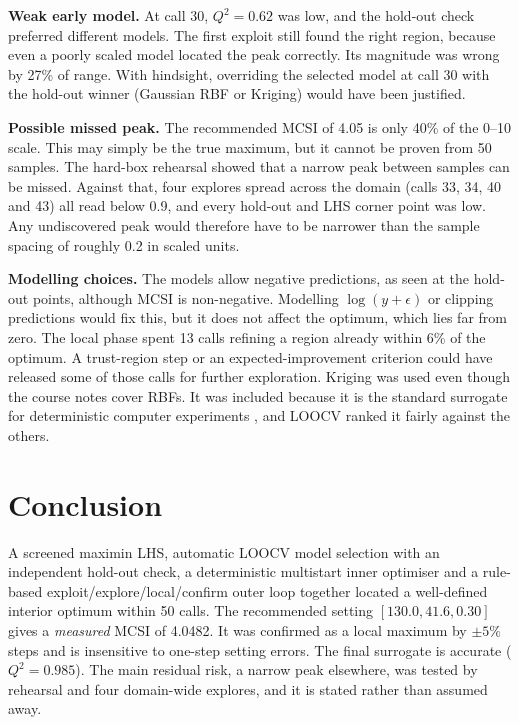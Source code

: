 \documentclass[11pt,a4paper]{article}
\newcommand{\Qsq}{Q^2}
\begin{document}
\textbf{Weak early model.}
At call 30, $\Qsq=0.62$ was low, and the hold-out check preferred different models.
The first exploit still found the right region, because even a poorly scaled model located the peak correctly.
Its magnitude was wrong by 27\% of range.
With hindsight, overriding the selected model at call 30 with the hold-out winner (Gaussian RBF or Kriging) would have been justified.

\textbf{Possible missed peak.}
The recommended MCSI of 4.05 is only 40\% of the 0--10 scale.
This may simply be the true maximum, but it cannot be proven from 50 samples.
The hard-box rehearsal showed that a narrow peak between samples can be missed.
Against that, four explores spread across the domain (calls 33, 34, 40 and 43) all read below 0.9, and every hold-out and LHS corner point was low.
Any undiscovered peak would therefore have to be narrower than the sample spacing of roughly 0.2 in scaled units.

\textbf{Modelling choices.}
The models allow negative predictions, as seen at the hold-out points, although MCSI is non-negative.
Modelling $\log(y+\epsilon)$ or clipping predictions would fix this, but it does not affect the optimum, which lies far from zero.
The local phase spent 13 calls refining a region already within 6\% of the optimum.
A trust-region step \cite{Forrester2008} or an expected-improvement criterion \cite{Jones1998} could have released some of those calls for further exploration.
Kriging was used even though the course notes cover RBFs.
It was included because it is the standard surrogate for deterministic computer experiments \cite{Sacks1989}, and LOOCV ranked it fairly against the others.

\section{Conclusion}
A screened maximin LHS, automatic LOOCV model selection with an independent hold-out check, a deterministic multistart inner optimiser and a rule-based exploit/explore/local/confirm outer loop together located a well-defined interior optimum within 50 calls.
The recommended setting $[130.0, 41.6, 0.30]$ gives a \emph{measured} MCSI of 4.0482.
It was confirmed as a local maximum by $\pm5\%$ steps and is insensitive to one-step setting errors.
The final surrogate is accurate ($\Qsq=0.985$).
The main residual risk, a narrow peak elsewhere, was tested by rehearsal and four domain-wide explores, and it is stated rather than assumed away.
\end{document}
